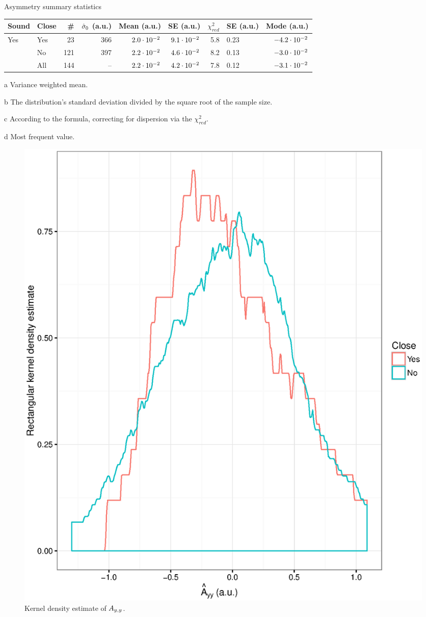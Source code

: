 \documentclass{report}
\begin{document}
\begin{threeparttable}[H]
	\centering
	\caption{Asymmetry summary statistics\label{tbl:AyySumStat}}
	\begin{tabular}{llrrrrrlr}
		\hline\hline
		Sound                & Close &  \# & $\CS*[0]$ (a.u.) & Mean\tnote{a} (a.u.) & SE\tnote{b} (a.u.) & $\chi^2_{red}$ & SE\tnote{c} (a.u.) & Mode\tnote{d} (a.u.) \\ \hline
		\multirow{3}{*}{Yes} & Yes   &  23 &              366 &       $2.0\cdot10^{-2}$ &     $9.1\cdot10^{-2}$ &            5.8 & 0.23               &      $-4.2\cdot10^{-2}$ \\
		                     & No    & 121 &              397 &       $2.2\cdot10^{-2}$ &     $4.6\cdot10^{-2}$ &            8.2 & 0.13               &      $-3.0\cdot10^{-2}$ \\
		                     & All   & 144 &               -- &       $2.2\cdot10^{-2}$ &     $4.2\cdot10^{-2}$ &            7.8 & 0.12               &      $-3.1\cdot10^{-2}$ \\ \hline
	\end{tabular}
	\begin{tablenotes}
		\item[a]{Variance weighted mean.}
		\item[b]{The distribution's standard deviation divided by the square root of the sample size.}
		\item[c]{According to the formula, correcting for dispersion via the $\chi^2_{red}$.}
		\item[d]{Most frequent value.}
	\end{tablenotes}
\end{threeparttable}

\begin{figure}
	\centering
	\includegraphics{Ayy_dens.eps}
	\caption{Kernel density estimate of $\Ayy$.}
\end{figure}
\end{document}
